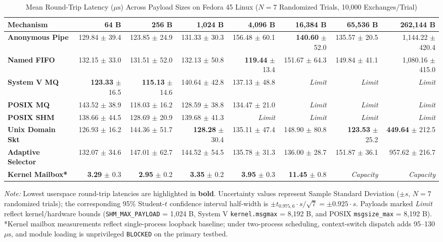 \begin{table}[t]
\centering
\caption{Mean Round-Trip Latency ($\mu\text{s}$) Across Payload Sizes on Fedora 45 Linux ($N=7$ Randomized Trials, 10,000 Exchanges/Trial)}
\label{tab:benchmark_results}
\scriptsize
\begin{tabular}{lrrrrrrr}
\toprule
\textbf{Mechanism} & \textbf{64 B} & \textbf{256 B} & \textbf{1,024 B} & \textbf{4,096 B} & \textbf{16,384 B} & \textbf{65,536 B} & \textbf{262,144 B} \\
\midrule
\textbf{Anonymous Pipe} & 129.84 $\pm$ 39.4 & 123.85 $\pm$ 24.9 & 131.33 $\pm$ 30.3 & 156.48 $\pm$ 60.1 & \textbf{140.60} $\pm$ 52.0 & 135.57 $\pm$ 20.5 & 1,144.22 $\pm$ 420.4 \\
\textbf{Named FIFO} & 132.15 $\pm$ 33.0 & 131.51 $\pm$ 52.0 & 132.13 $\pm$ 50.8 & \textbf{119.44} $\pm$ 13.4 & 151.67 $\pm$ 64.3 & 149.84 $\pm$ 41.1 & 1,080.16 $\pm$ 415.0 \\
\textbf{System V MQ} & \textbf{123.33} $\pm$ 16.5 & \textbf{115.13} $\pm$ 14.6 & 140.64 $\pm$ 42.8 & 137.13 $\pm$ 48.8 & \textit{Limit} & \textit{Limit} & \textit{Limit} \\
\textbf{POSIX MQ} & 143.52 $\pm$ 38.9 & 118.03 $\pm$ 16.2 & 128.59 $\pm$ 38.8 & 134.47 $\pm$ 21.0 & \textit{Limit} & \textit{Limit} & \textit{Limit} \\
\textbf{POSIX SHM} & 138.66 $\pm$ 44.5 & 128.69 $\pm$ 20.9 & 139.68 $\pm$ 41.3 & \textit{Limit} & \textit{Limit} & \textit{Limit} & \textit{Limit} \\
\textbf{Unix Domain Skt} & 126.93 $\pm$ 16.2 & 144.36 $\pm$ 51.7 & \textbf{128.28} $\pm$ 30.4 & 135.11 $\pm$ 47.4 & 148.90 $\pm$ 80.8 & \textbf{123.53} $\pm$ 25.2 & \textbf{449.64} $\pm$ 212.5 \\
\midrule
\textbf{Adaptive Selector} & 132.07 $\pm$ 34.6 & 147.01 $\pm$ 62.7 & 144.52 $\pm$ 54.5 & 135.78 $\pm$ 31.3 & 136.00 $\pm$ 28.7 & 151.87 $\pm$ 36.1 & 957.62 $\pm$ 216.7 \\
\textbf{Kernel Mailbox*} & \textbf{3.29} $\pm$ 0.3 & \textbf{2.95} $\pm$ 0.2 & \textbf{3.35} $\pm$ 0.2 & \textbf{3.95} $\pm$ 0.3 & \textbf{11.45} $\pm$ 0.8 & \textit{Capacity} & \textit{Capacity} \\
\bottomrule
\end{tabular}
{\vskip 1.5pt\tiny\noindent \textit{Note:} Lowest userspace round-trip latencies are highlighted in \textbf{bold}. Uncertainty values represent Sample Standard Deviation ($\pm s$, $N=7$ randomized trials); the corresponding 95\% Student-$t$ confidence interval half-width is $\pm t_{0.975, 6} \cdot s / \sqrt{7} = \pm 0.925 \cdot s$. Payloads marked \textit{Limit} reflect kernel/hardware bounds (\texttt{SHM\_MAX\_PAYLOAD} = 1,024 B, System V \texttt{kernel.msgmax} = 8,192 B, and POSIX \texttt{msgsize\_max} = 8,192 B). *Kernel mailbox measurements reflect single-process loopback baseline; under two-process scheduling, context-switch dispatch adds 95--130 $\mu\text{s}$, and module loading is unprivileged \texttt{BLOCKED} on the primary testbed.\par}
\end{table}
